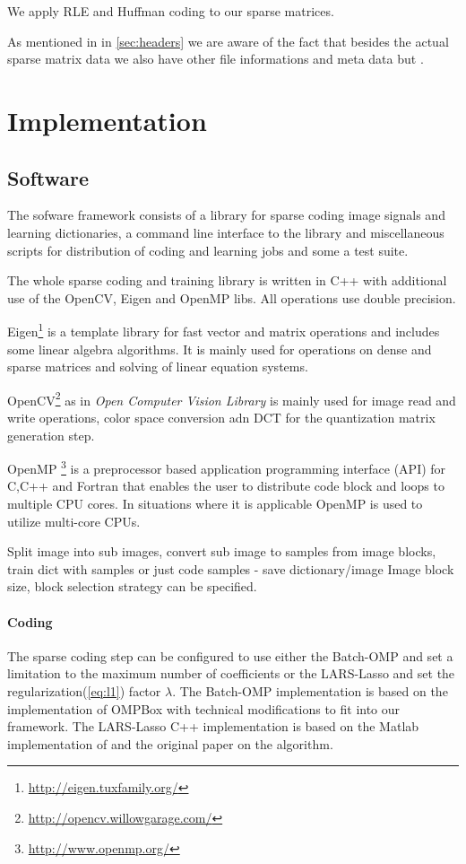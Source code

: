 We apply RLE and Huffman coding to our sparse matrices. 


As mentioned in in \ref{sec:headers} we are aware of the fact that besides
the actual sparse matrix data we also have other file informations and meta
data but .  



\section{Implementation}
\subsection*{Software}
The sofware framework consists of a library for sparse coding image signals 
and learning dictionaries, a command line interface to the library and
miscellaneous scripts for distribution of coding and learning jobs and
some a test suite.

The whole sparse coding and training library is written in C++ with
additional use of the OpenCV, Eigen and OpenMP libs. All operations use double
precision. 

Eigen\footnote{\url{http://eigen.tuxfamily.org/}\cite{Eigen}}
is a template library for fast vector and matrix operations 
and includes some linear algebra algorithms. It is mainly used for operations on
dense and sparse matrices and solving of linear equation
systems. 

OpenCV\footnote{\url{http://opencv.willowgarage.com/}\cite{OpenCV}} as
in \emph{Open Computer Vision Library} is mainly used for
image read and write operations, color space conversion adn DCT for the
quantization matrix generation step. 

OpenMP \footnote{\url{http://www.openmp.org/}\cite{OpenMP}} is a preprocessor
based application programming interface (API) for C,C++ and Fortran that enables
the user to distribute code block and loops to multiple CPU cores. In situations
where it is applicable OpenMP is used to utilize multi-core CPUs. 

Split image into sub images, convert sub image to samples from image blocks, 
train dict with samples or just code samples - save dictionary/image
Image block size, block selection strategy can be specified.

\paragraph{Coding}
The sparse coding step can be configured to use either the Batch-OMP and 
set a limitation to the maximum number of coefficients or the LARS-Lasso 
and set the regularization(\ref{eq:l1}) factor $\lambda$.
The Batch-OMP implementation is based on the implementation
of \cite{Rubinstein} OMPBox with technical modifications to fit into our
framework. The LARS-Lasso C++ implementation is based on the Matlab
implementation of\cite{Strand2005} and the original
paper\cite{Efron2004} on the algorithm.

